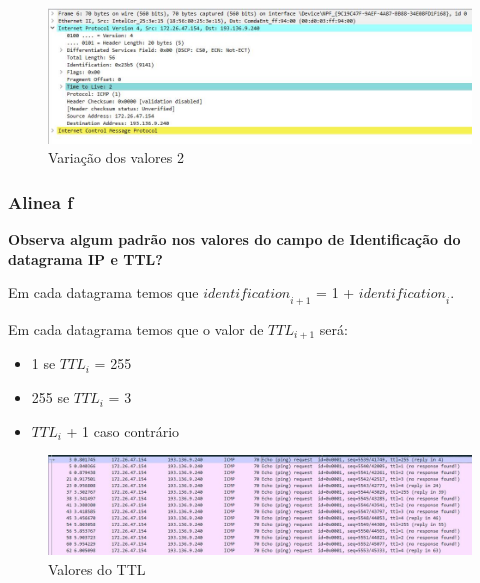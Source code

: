 \documentclass{article}
\begin{document}
\begin{figure}[h]
	\centering
	\includegraphics[scale = 0.5]{valores-variam-2.JPG}
	\caption{Variação dos valores 2}
\end{figure}

\newpage

\subsubsection{Alinea f}
\textbf{Observa algum padrão nos valores do campo de Identificação do datagrama IP e TTL?} \\\par
Em cada datagrama temos que $\textit{identification}_{i+1}$ = 1 + $\textit{identification}_i$.\par
Em cada datagrama temos que o valor de $TTL_{i+1}$ será:
\begin{itemize}
	\item 1 se $TTL_i$ = 255
	\item 255 se $TTL_i$ = 3
	\item $TTL_i$ + 1 caso contrário
\end{itemize}\par

\begin{figure}[h]
	\centering
	\includegraphics[scale = 0.5]{valores-padroes.JPG}
	\caption{Valores do TTL}
\end{figure}
\end{document}
